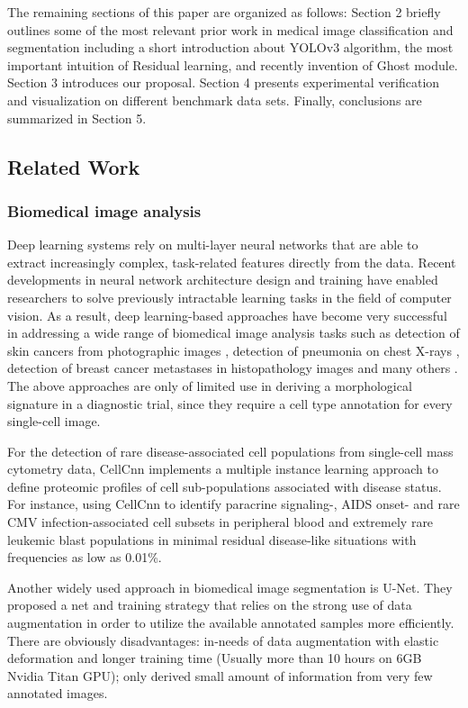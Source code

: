 The remaining sections of this paper are organized as follows: Section 2 briefly outlines some of the most relevant  prior work in medical image classification and segmentation including a short introduction about YOLOv3 \cite{b33} algorithm, the most important intuition of Residual learning, and recently invention of Ghost module.
Section 3 introduces our proposal. Section 4 presents experimental verification  and visualization on different benchmark data sets. Finally, conclusions are summarized in Section 5.

\subsection{Related Work}
\subsubsection{Biomedical image analysis}

Deep learning systems rely on multi-layer neural networks that are able to extract increasingly complex, task-related features directly from the data. Recent developments in neural network architecture design and training have enabled researchers to solve previously intractable learning tasks in the field of computer vision. As a result, deep learning-based approaches have become very successful in addressing a wide range of biomedical image analysis tasks such as detection of skin cancers from photographic images \cite{b10}, detection of pneumonia on chest X-rays \cite{b13}, detection of breast cancer metastases in histopathology images and many others \cite{b2}. 
The above approaches are only of limited use in deriving a morphological signature in a diagnostic trial, since they require a cell type annotation for every single-cell image.


For the detection of rare disease-associated cell populations from single-cell mass cytometry data, CellCnn \cite{b3} implements a multiple instance learning approach to define proteomic profiles of cell sub-populations associated with disease status. For instance, using CellCnn to identify paracrine signaling-, AIDS onset- and rare CMV infection-associated cell subsets in peripheral blood and extremely rare leukemic blast populations in minimal residual disease-like situations with frequencies as low as 0.01\%\cite{b3}.

Another widely used approach in biomedical image segmentation is U-Net\cite{b14}. They proposed a net and training strategy that relies on the strong use of data augmentation in order to utilize the available annotated samples more efficiently\cite{b14}.
There are obviously disadvantages: in-needs of data augmentation with elastic deformation and longer training time (Usually more than 10 hours on 6GB Nvidia Titan GPU); only derived small amount of information from very few annotated images\cite{b14}.

